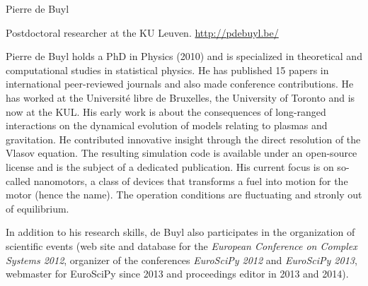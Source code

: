 \begin{participant}[type=R,PM=12,gender=male,salary=5500]{Pierre de Buyl}

Postdoctoral researcher at the KU Leuven. \url{http://pdebuyl.be/}

Pierre de Buyl holds a PhD in Physics (2010) and is specialized in theoretical and
computational studies in statistical physics. He has published 15 papers in international
peer-reviewed journals and also made conference contributions. He has worked at the
Université libre de Bruxelles, the University of Toronto and is now at the KUL.
%
His early work is about the consequences of long-ranged interactions on the dynamical
evolution of models relating to plasmas and gravitation.
%
He contributed innovative insight through the direct resolution of the Vlasov equation. The
resulting simulation code is available under an open-source license and is the subject of a
dedicated publication.
%
His current focus is on so-called nanomotors, a class of devices that transforms a fuel into
motion for the motor (hence the name). The operation conditions are fluctuating and stronly
out of equilibrium.

In addition to his research skills, de Buyl also participates in the organization of
scientific events (web site and database for the {\em European Conference on Complex Systems
  2012}, organizer of the conferences {\em EuroSciPy 2012} and {\em EuroSciPy 2013},
webmaster for EuroSciPy since 2013 and proceedings editor in 2013 and 2014).

\end{participant}
